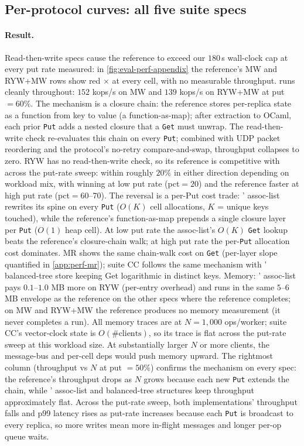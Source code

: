 \subsection{Per-protocol curves: all five \sys{} suite specs}
\label{app:perf-curves}


\paragraph{Result.}
Read-then-write specs cause the reference to exceed our $180$\,s wall-clock cap at every put rate measured: in \cref{fig:eval-perf-appendix} the reference's MW and RYW+MW rows show red $\times$ at every cell, with no measurable throughput. \sys{} runs cleanly throughout: $152$ kops/s on MW and $139$ kops/s on RYW+MW at put $=60\%$. The mechanism is a closure chain: the reference stores per-replica state as a function from key to value (a function-as-map); after extraction to OCaml, each prior \texttt{Put} adds a nested closure that a \texttt{Get} must unwrap. The read-then-write check re-evaluates this chain on every \texttt{Put}; combined with UDP packet reordering and the protocol's no-retry compare-and-swap, throughput collapses to zero. RYW has no read-then-write check, so its reference is competitive with \sys{} across the put-rate sweep: within roughly $20\%$ in either direction depending on workload mix, with \sys{} winning at low put rate (pct$=20$) and the reference faster at high put rate (pct$=60$--$70$). The reversal is a per-Put cost trade: \sys{}' assoc-list rewrites its spine on every \texttt{Put} ($O(K)$ cell allocations, $K$ = unique keys touched), while the reference's function-as-map prepends a single closure layer per \texttt{Put} ($O(1)$ heap cell). At low put rate the assoc-list's $O(K)$ \texttt{Get} lookup beats the reference's closure-chain walk; at high put rate the per-\texttt{Put} allocation cost dominates. MR shows the same chain-walk cost on \texttt{Get} (per-layer slope quantified in \cref{app:perf-mr}); \sys{} suite CC follows the same mechanism with \sys{}' balanced-tree store keeping Get logarithmic in distinct keys. Memory: \sys{}' assoc-list pays $0.1$--$1.0$ MB more on RYW (per-entry overhead) and runs in the same $5$--$6$ MB envelope as the reference on the other specs where the reference completes; on MW and RYW+MW the reference produces no memory measurement (it never completes a run). All memory traces are at $N=1{,}000$ ops/worker; \sys{} suite CC's vector-clock state is $O(\text{\#clients})$, so its trace is flat across the put-rate sweep at this workload size. At substantially larger $N$ or more clients, the message-bus and per-cell deps would push memory upward. The rightmost column (throughput vs $N$ at put $=50\%$) confirms the mechanism on every spec: the reference's throughput drops as $N$ grows because each new \texttt{Put} extends the chain, while \sys{}' assoc-list and balanced-tree structures keep throughput approximately flat. Across the put-rate sweep, both implementations' throughput falls and p99 latency rises as put-rate increases because each \texttt{Put} is broadcast to every replica, so more writes mean more in-flight messages and longer per-op queue waits.

